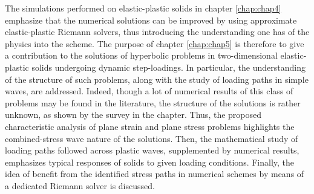 The simulations performed on elastic-plastic solids in chapter \ref{chap:chap4} emphasize that the numerical solutions can be improved by using approximate elastic-plastic Riemann solvers, thus introducing the understanding one has of the physics into the scheme.
The purpose of chapter \ref{chap:chap5} is therefore to give a contribution to the solutions of hyperbolic problems in two-dimensional elastic-plastic solids undergoing dynamic step-loadings.
In particular, the understanding of the structure of such problems, along with the study of loading paths in simple waves, are addressed. %
Indeed, though a lot of numerical results of this class of problems may be found in the literature, the structure of the solutions is rather unknown, as shown by the survey in the chapter. 
Thus, the proposed characteristic analysis of plane strain and plane stress problems highlights the combined-stress wave nature of the solutions.
Then, the mathematical study of loading paths followed across plastic waves, supplemented by numerical results, emphasizes typical responses of solids to given loading conditions.
Finally, the idea of benefit from the identified stress paths in numerical schemes by means of a dedicated Riemann solver is discussed.


